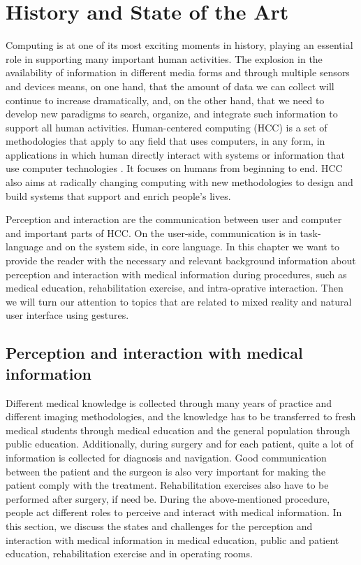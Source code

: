 
\chapter{History and State of the Art} \label{sec:bg}
Computing is at one of its most exciting moments in history, playing an essential role in supporting many important human activities. The explosion in the availability of information in different media forms and through multiple sensors and devices means, on one hand, that the amount of data we can collect will continue to increase dramatically, and, on the other hand, that we need to develop new paradigms to search, organize, and integrate such information to support all human activities.
Human-centered computing (HCC) is a set of methodologies that apply to any field that uses computers, in any form, in applications in which human directly interact with systems or information that use computer technologies \cite{Jaimes2006f}.
It focuses on humans from beginning to end. HCC also aims at radically changing computing with new methodologies to design and build systems that support and enrich people's lives. 

Perception and interaction are the communication between user and computer and important parts of HCC. On the user-side, communication is in task-language and on the system side, in core language. 
In this chapter we want to provide the reader with the necessary and relevant background information about perception and interaction with medical information during procedures, such as medical education, rehabilitation exercise, and intra-oprative interaction.
Then we will turn our attention to topics that are related to mixed reality and natural user interface using gestures. 

\section{Perception and interaction with medical information}
Different medical knowledge is collected through many years of practice and different imaging methodologies, and the knowledge has to be transferred to fresh medical students through medical education and the general population through public education. 
Additionally, during surgery and for each patient, quite a lot of information is collected for diagnosis and navigation.
Good communication between the patient and the surgeon is also very important for making the patient comply with the treatment. 
Rehabilitation exercises also have to be performed after surgery, if need be.
During the above-mentioned procedure, people act different roles to perceive and interact with medical information. In this section, we discuss the states and challenges for the perception and interaction with medical information in medical education, public and patient education, rehabilitation exercise and in operating rooms.

